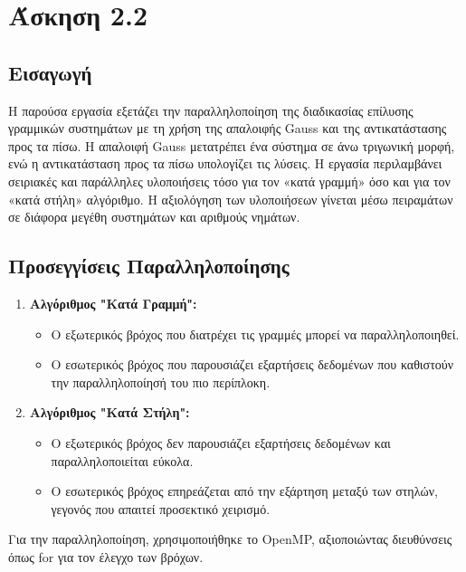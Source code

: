 \documentclass{article}
\begin{document}
\section*{Άσκηση 2.2}
\subsection*{Εισαγωγή}
Η παρούσα εργασία εξετάζει την παραλληλοποίηση της διαδικασίας επίλυσης γραμμικών συστημάτων με τη χρήση της απαλοιφής Gauss και της αντικατάστασης προς τα πίσω. Η απαλοιφή Gauss μετατρέπει ένα σύστημα σε άνω τριγωνική μορφή, ενώ η αντικατάσταση προς τα πίσω υπολογίζει τις λύσεις. Η εργασία περιλαμβάνει σειριακές και παράλληλες υλοποιήσεις τόσο για τον «κατά γραμμή» όσο και για τον «κατά στήλη» αλγόριθμο. Η αξιολόγηση των υλοποιήσεων γίνεται μέσω πειραμάτων σε διάφορα μεγέθη συστημάτων και αριθμούς νημάτων.
\subsection*{Προσεγγίσεις Παραλληλοποίησης}
\begin{enumerate}
    \item \textbf{Αλγόριθμος "Κατά Γραμμή":}
    \begin{itemize}
        \item Ο εξωτερικός βρόχος που διατρέχει τις γραμμές μπορεί να παραλληλοποιηθεί.
        \item Ο εσωτερικός βρόχος που παρουσιάζει εξαρτήσεις δεδομένων που καθιστούν την παραλληλοποίησή του πιο περίπλοκη.
    \end{itemize}
    \item \textbf{Αλγόριθμος "Κατά Στήλη":}
    \begin{itemize}
        \item Ο εξωτερικός βρόχος δεν παρουσιάζει εξαρτήσεις δεδομένων και παραλληλοποιείται εύκολα.
        \item Ο εσωτερικός βρόχος επηρεάζεται από την εξάρτηση μεταξύ των στηλών, γεγονός που απαιτεί προσεκτικό χειρισμό.
    \end{itemize}
\end{enumerate}
Για την παραλληλοποίηση, χρησιμοποιήθηκε το OpenMP, αξιοποιώντας διευθύνσεις όπως  for για τον έλεγχο των βρόχων.
\end{document}
